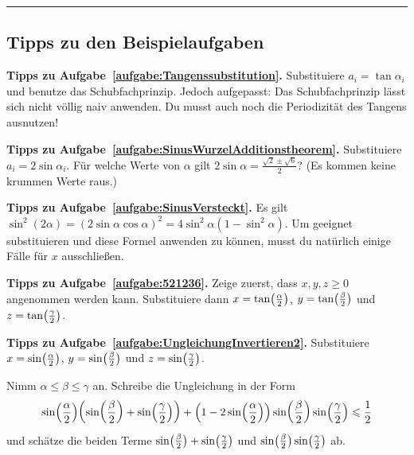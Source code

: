 \newpage\phantom{newpage}\vfill\hrule\vspace{-1em}



\subsection*{Tipps zu den Beispielaufgaben}

\textbf{Tipps zu Aufgabe~\ref{aufgabe:Tangenssubstitution}.} Substituiere $a_i=\tan \alpha_i$ und benutze das Schubfachprinzip. Jedoch aufgepasst: Das Schubfachprinzip lässt sich nicht völlig naiv anwenden. Du musst auch noch die Periodizität des Tangens ausnutzen!

\textbf{Tipps zu Aufgabe~\ref{aufgabe:SinusWurzelAdditionstheorem}.} Substituiere $a_i=2\sin\alpha_i$. Für welche Werte von $\alpha$ gilt $2\sin\alpha = \frac{\sqrt{2}\pm\sqrt{6}}{2}$? (Es kommen keine krummen Werte raus.)

\textbf{Tipps zu Aufgabe~\ref{aufgabe:SinusVersteckt}.} Es gilt $\sin^2(2\alpha)=(2\sin\alpha\cos\alpha)^2=4\sin^2\alpha(1-\sin^2\alpha)$. Um geeignet substituieren und diese Formel anwenden zu können, musst du natürlich einige Fälle für $x$ ausschließen.

\textbf{Tipps zu Aufgabe~\ref{aufgabe:521236}.} Zeige zuerst, dass $x,y,z\geqslant 0$ angenommen werden kann. Substituiere dann $x=\tan\parens[\big]{\frac{\alpha}2}$, $y=\tan\parens[\big]{\frac{\beta}2}$ und $z=\tan\parens[\big]{\frac{\gamma}2}$.

\textbf{Tipps zu Aufgabe~\ref{aufgabe:UngleichungInvertieren2}.} Substituiere $x=\sin\parens[\big]{\frac{\alpha}2}$, $y=\sin\parens[\big]{\frac{\beta}2}$ und $z=\sin\parens[\big]{\frac{\gamma}2}$.

Nimm $\alpha\leqslant \beta\leqslant \gamma$ an. Schreibe die Ungleichung in der Form
\begin{equation*}
	\sin\parens*{\frac{\alpha}2}\parens*{\sin\parens*{\frac{\beta}2}+\sin\parens*{\frac{\gamma}2}}+\parens*{1-2\sin\parens*{\frac{\alpha}2}}\sin\parens*{\frac{\beta}2}\sin\parens*{\frac{\gamma}2}\leqslant \frac12
\end{equation*}
und schätze die beiden Terme $\sin\parens[\big]{\frac{\beta}2}+\sin\parens[\big]{\frac{\gamma}2}$ und $\sin\parens[\big]{\frac{\beta}2}\sin\parens[\big]{\frac{\gamma}2}$ ab.